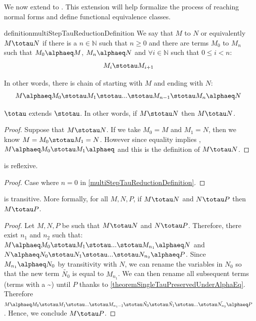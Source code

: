 We now extend \osteptaureduction to \msteptaureduction. This extension will help formalize the process of reaching normal forms and define functional equivalence classes.

\begin{reusable}{definition}{multiStepTauReductionDefinition}
    We say that $M$ \taureduces to $N$ or equivalently $M \totau N$ if there is a $n \in \mathbb{N}$ such that $n \geq 0$ and there are terms $M_{0}$ to $M_{n}$ such that $M_{0} \alphaeq M$, $M_{n} \alphaeq N$ and $\forall i \in \mathbb{N}$ such that $0 \leq i < n$:
    \[
    M_{i} \stotau M_{i+1}
    \]
\end{reusable}


In other words, there is chain of \osteptaureductions starting with $M$ and ending with $N$:
\[
M \alphaeq M_{0} \stotau M_{1} \stotau ... \stotau M_{n-1} \stotau M_{n} \alphaeq N
\]

\begin{lemma}
    $\totau$ extends $\stotau$. In other words, if $M \stotau N$ then $M \totau N$.
\end{lemma}

\begin{proof}
    Suppose that $M \stotau N$. If we take $M_{0}=M$ and $M_{1}=N$, then we know $M=M_{0} \stotau M_{1}=N$. However since equality implies \alphaequivalence , $M \alphaeq M_{0} \stotau M_{1} \alphaeq$ and this is the definition of $M \totau N$.
\end{proof}


\begin{lemma}
    \taureduction is reflexive.
\end{lemma}

\begin{proof}
    Case where $n=0$ in \cref{multiStepTauReductionDefinition}.
\end{proof}

\begin{lemma}
    \taureduction is transitive. More formally, for all $M, N, P$, if $M \totau N$ and $N \totau P$ then $M \totau P$.
\end{lemma}

\begin{proof}
    Let $M, N, P$ be such that $M \totau N$ and $N \totau P$. Therefore, there exist $n_1$ and $n_2$ such that:
    $M \alphaeq M_{0} \stotau M_{1} \stotau ... \stotau M_{n_1} \alphaeq N$ and $N \alphaeq N_{0} \stotau N_{1} \stotau ... \stotau N_{n_2} \alphaeq P$. Since $M_{n_1} \alphaeq N_{0}$ by transitivity with $N$, we can rename the variables in $N_{0}$ so that the new term $\tilde{N_{0}}$ is equal to $M_{n_1}$. We can then rename all subsequent terms (terms with a \textasciitilde) until $P$ thanks to \cref{theoremSingleTauPreservedUnderAlphaEq}. Therefore $M \alphaeq M_{0} \stotau M_{1} \stotau ... \stotau M_{n_1-1} \stotau \tilde{N_0} \stotau \tilde{N_{1}} \stotau ... \stotau \tilde{N_{n_2}} \alphaeq P$. Hence, we conclude $M \totau P$.
\end{proof}
